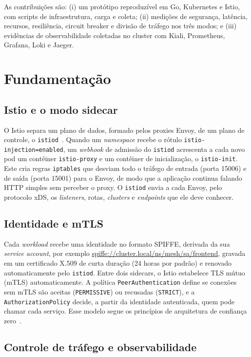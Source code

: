 \documentclass[12pt]{article}
\begin{document}
As contribuições são: (i) um protótipo reproduzível em Go, Kubernetes e Istio,
com scripts de infraestrutura, carga e coleta; (ii) medições de segurança,
latência, recursos, resiliência, circuit breaker e divisão de tráfego nos três
modos; e (iii) evidências de observabilidade coletadas no cluster com Kiali,
Prometheus, Grafana, Loki e Jaeger.

\section{Fundamentação}

\subsection{Istio e o modo sidecar}

O Istio separa um plano de dados, formado pelos proxies Envoy, de um plano de
controle, o \texttt{istiod}~\cite{istio-arch}. Quando um \emph{namespace} recebe
o rótulo \texttt{istio-injection=enabled}, um \emph{webhook} de admissão do
\texttt{istiod} acrescenta a cada novo pod um contêiner \texttt{istio-proxy} e
um contêiner de inicialização, o \texttt{istio-init}. Este cria regras
\texttt{iptables} que desviam todo o tráfego de entrada (porta 15006) e de
saída (porta 15001) para o Envoy, de modo que a aplicação continua falando
HTTP simples sem perceber o proxy. O \texttt{istiod} envia a cada Envoy, pelo
protocolo xDS, os \emph{listeners}, rotas, \emph{clusters} e \emph{endpoints}
que ele deve conhecer.

\subsection{Identidade e mTLS}

Cada \emph{workload} recebe uma identidade no formato SPIFFE, derivada da sua
\emph{service account}, por exemplo
\url{spiffe://cluster.local/ns/mesh/sa/frontend}, gravada em um certificado
X.509 de curta duração (24 horas por padrão) e renovado automaticamente pelo
\texttt{istiod}. Entre dois sidecars, o Istio estabelece TLS mútuo (mTLS)
automaticamente. A política \texttt{PeerAuthentication} define se conexões sem
mTLS são aceitas (\texttt{PERMISSIVE}) ou recusadas (\texttt{STRICT}), e a
\texttt{AuthorizationPolicy} decide, a partir da identidade autenticada, quem
pode chamar cada serviço. Esse modelo segue os princípios de arquitetura de
confiança zero~\cite{rose2020}.

\subsection{Controle de tráfego e observabilidade}
\end{document}
